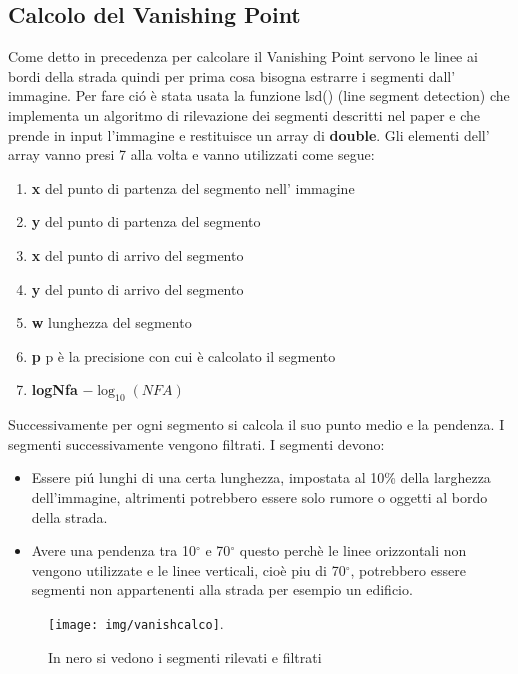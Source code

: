 	\subsection{Calcolo del Vanishing Point}
		Come detto in precedenza per calcolare il Vanishing Point servono le linee ai bordi della strada quindi per prima cosa bisogna estrarre i segmenti dall' immagine. Per fare ci\'o è stata usata la funzione lsd() (line segment detection) che implementa un algoritmo di rilevazione dei segmenti descritti nel paper \cite{lsd} e che prende in input l'immagine e restituisce un array di \textbf{double}.
		Gli elementi dell' array vanno presi 7 alla volta e vanno utilizzati come segue:
		\begin{enumerate}
			\item \textbf{x} del punto di partenza del segmento nell' immagine
			\item \textbf{y} del punto di partenza del segmento
			\item \textbf{x} del punto di arrivo del segmento
			\item \textbf{y} del punto di arrivo del segmento
			\item \textbf{w} lunghezza del segmento
			\item \textbf{p} p è la precisione con cui è calcolato il segmento
			\item \textbf{logNfa} $ - \log_{10}(NFA)$
		\end{enumerate}
		Successivamente per ogni segmento si calcola il suo punto medio  e la pendenza. I segmenti successivamente vengono filtrati.
		I segmenti devono:
		\begin{itemize}
			\item Essere pi\'u lunghi di una certa lunghezza, impostata al 10\% della larghezza dell'immagine, altrimenti potrebbero essere solo rumore o oggetti al bordo della strada.
			\item Avere una pendenza tra 10$^{\circ}$ e 70$^{\circ}$ questo perchè le linee orizzontali non vengono utilizzate e le linee verticali, cioè piu di 70$^{\circ}$, potrebbero essere segmenti non appartenenti alla strada per esempio un edificio.
		\end{itemize}
		\begin{figure}[!ht]
			\centering
			\texttt{[image: img/vanishcalco]}.
			\caption[Segmenti rilevati]{In nero si vedono i segmenti rilevati e filtrati}
		\end{figure}

